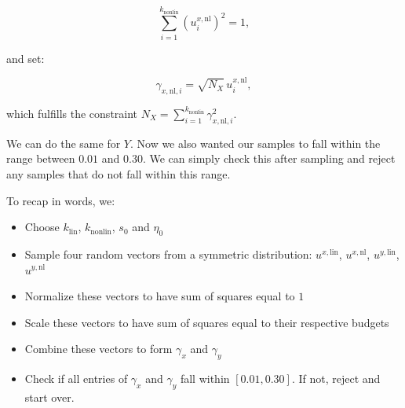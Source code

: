 \documentclass{article}
\begin{document}
\[
\sum_{i=1}^{k_{\text{nonlin}}} (u^{x,\text{nl}}_i)^2 = 1,
\]

\noindent
and set:

\[
\gamma_{x,\text{nl},i} = \sqrt{N_X}\, u^{x,\text{nl}}_i,
\]

\noindent
which fulfills the constraint $N_X = \sum_{i=1}^{k_{\text{nonlin}}} \gamma_{x,\text{nl},i}^2$.

We can do the same for $Y$. Now we also wanted our samples to fall
within the range between $0.01$ and $0.30$. We can simply check this after sampling and reject any samples that do not fall within this range.

To recap in words, we:

\begin{itemize}
    \item Choose $k_{\text{lin}}$, $k_{\text{nonlin}}$, $s_0$ and $\eta_0$
    \item Sample four random vectors from a symmetric distribution: $u^{x,\text{lin}}$, $u^{x,\text{nl}}$, $u^{y,\text{lin}}$, $u^{y,\text{nl}}$
    \item Normalize these vectors to have sum of squares equal to $1$
    \item Scale these vectors to have sum of squares equal to their respective budgets
    \item Combine these vectors to form $\gamma_x$ and $\gamma_y$
    \item Check if all entries of $\gamma_x$ and $\gamma_y$ fall within $[0.01, 0.30]$. If not, reject and start over.
\end{itemize}
\end{document}
